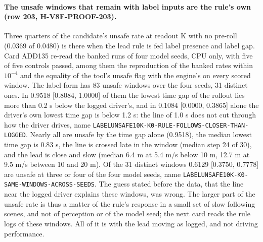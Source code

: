 \paragraph{The unsafe windows that remain with label inputs are the rule's own (row 203, H-V8F-PROOF-203).} Three quarters of the candidate's unsafe rate at readout K with no pre-roll (0.0369 of 0.0480) is there when the lead rule is fed label presence and label gap. Card ADD135 re-read the banked runs of four model seeds, CPU only, with five of five controls passed, among them the reproduction of the banked rates within $10^{-4}$ and the equality of the tool's unsafe flag with the engine's on every scored window. The label form has 83 unsafe windows over the four seeds, 31 distinct ones. In 0.9518 [0.8084, 1.0000] of them the lowest time gap of the rollout lies more than 0.2 s below the logged driver's, and in 0.1084 [0.0000, 0.3865] alone the driver's own lowest time gap is below 1.2 s: the line of 1.0 s does not cut through how the driver drives, name \texttt{LABELUNSAFE10K-K0-RULE-\allowbreak FOLLOWS-CLOSER-THAN-LOGGED}. Nearly all are unsafe by the time gap alone (0.9518), the median lowest time gap is 0.83 s, the line is crossed late in the window (median step 24 of 30), and the lead is close and slow (median 6.4 m at 5.4 m/s below 10 m, 12.7 m at 9.5 m/s between 10 and 20 m). Of the 31 distinct windows 0.6129 [0.3750, 0.7778] are unsafe at three or four of the four model seeds, name \texttt{LABELUNSAFE10K-K0-SAME-\allowbreak WINDOWS-ACROSS-SEEDS}. The guess stated before the data, that the line near the logged driver explains these windows, was wrong. The larger part of the unsafe rate is thus a matter of the rule's response in a small set of slow following scenes, and not of perception or of the model seed; the next card reads the rule logs of these windows. All of it is  with the lead moving as logged, and not driving performance.

